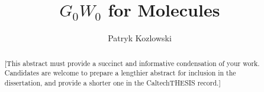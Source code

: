\documentclass[12pt]{caltech_thesis}
\begin{document}
\title{$G_0W_0$ for Molecules}
\author{Patryk Kozlowski}

\address{Pasadena, California}                     %



\maketitle[logo]

\begin{acknowledgements} 	 
\end{acknowledgements}

\begin{abstract}
   [This abstract must provide a succinct and informative condensation of your work. Candidates are welcome to prepare a lengthier abstract for inclusion in the dissertation, and provide a shorter one in the CaltechTHESIS record.]
\end{abstract}



\tableofcontents
\listoffigures
\listoftables
\printnomenclature

\mainmatter
\end{document}
